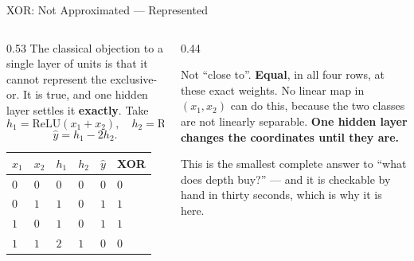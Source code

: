 \begin{frame}{XOR: Not Approximated --- Represented}
\begin{columns}[T]
\begin{column}{0.53\textwidth}
\small
The classical objection to a single layer of units is that it cannot represent the exclusive-or. It is true, and one hidden layer settles it \textbf{exactly}. Take
\[
  h_1=\mathrm{ReLU}(x_1+x_2),\quad h_2=\mathrm{ReLU}(x_1+x_2-1),
\]
\[
  \hat y=h_1-2h_2 .
\]
\medskip
\begin{center}\footnotesize
\begin{tabularx}{\linewidth}{@{}>{\centering\arraybackslash}X >{\centering\arraybackslash}X >{\centering\arraybackslash}X >{\centering\arraybackslash}X >{\centering\arraybackslash}X >{\centering\arraybackslash}X@{}}
\toprule
$x_1$ & $x_2$ & $h_1$ & $h_2$ & $\hat y$ & XOR \\
\midrule
$0$ & $0$ & $0$ & $0$ & $0$ & $0$ \\
$0$ & $1$ & $1$ & $0$ & $1$ & $1$ \\
$1$ & $0$ & $1$ & $0$ & $1$ & $1$ \\
$1$ & $1$ & $2$ & $1$ & $0$ & $0$ \\
\bottomrule
\end{tabularx}
\end{center}
\end{column}
\begin{column}{0.44\textwidth}
\begin{takeawaybox}[title=\textbf{Read the last column}]\small
Not ``close to''. \textbf{Equal}, in all four rows, at these exact weights.
\medskip
No linear map in $(x_1,x_2)$ can do this, because the two classes are not linearly separable. \textbf{One hidden layer changes the coordinates until they are.}
\end{takeawaybox}
\medskip
\begin{examplebox}\footnotesize
This is the smallest complete answer to ``what does depth buy?'' --- and it is checkable by hand in thirty seconds, which is why it is here.
\end{examplebox}
\end{column}
\end{columns}
\vspace{1mm}
\end{frame}

